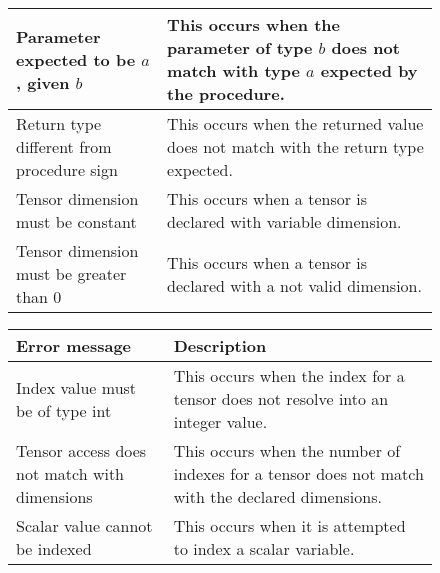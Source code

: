 \begin{figure}[h]
\begin{tabular}{p{1.5in}p{2.5in}}
        \midrule Parameter expected \newline to be $a$, given $b$ &
        This occurs when the parameter of type $b$ does not match with type $a$
        expected by the procedure.\\

        \midrule Return type \newline different from \newline procedure sign &
        This occurs when the returned value does not match with the return
        type expected.\\

        \midrule Tensor dimension must be constant &
	This occurs when a tensor is declared with variable dimension.\\

        \midrule Tensor dimension must be greater than 0 &
	This occurs when a tensor is declared with a not valid dimension.\\

        \bottomrule
    \end{tabular}
\end{figure}

\newpage

\begin{figure}[h]
    \centering
    \begin{tabular}{p{1.5in}p{2.5in}}
        \toprule
        \textbf{Error message} & \textbf{Description}\\

        \midrule Index value must be of type int &
	This occurs when the index for a tensor does not resolve into an
	integer value.\\

        \midrule Tensor access does not match with dimensions &
	This occurs when the number of indexes for a tensor does not match
	with the declared dimensions.\\

        \midrule Scalar value cannot be indexed &
	This occurs when it is attempted to index a scalar variable.\\

        \bottomrule
    \end{tabular}
\end{figure}

